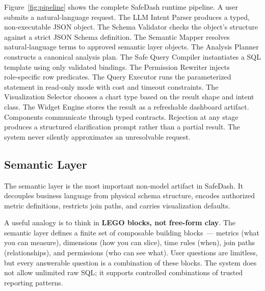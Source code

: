 \documentclass[11pt]{article}
\begin{document}
Figure~\ref{fig:pipeline} shows the complete SafeDash runtime pipeline. A user submits a natural‑language request. The LLM Intent Parser produces a typed, non‑executable JSON object. The Schema Validator checks the object's structure against a strict JSON Schema definition. The Semantic Mapper resolves natural‑language terms to approved semantic layer objects. The Analysis Planner constructs a canonical analysis plan. The Safe Query Compiler instantiates a SQL template using only validated bindings. The Permission Rewriter injects role‑specific row predicates. The Query Executor runs the parameterized statement in read‑only mode with cost and timeout constraints. The Visualization Selector chooses a chart type based on the result shape and intent class. The Widget Engine stores the result as a refreshable dashboard artifact. Components communicate through typed contracts. Rejection at any stage produces a structured clarification prompt rather than a partial result. The system never silently approximates an unresolvable request.

\subsection{Semantic Layer}
The semantic layer is the most important non‑model artifact in SafeDash. It decouples business language from physical schema structure, encodes authorized metric definitions, restricts join paths, and carries visualization defaults.

A useful analogy is to think in \textbf{LEGO blocks, not free-form clay}. The semantic layer defines a finite set of composable building blocks~--- metrics (what you can measure), dimensions (how you can slice), time rules (when), join paths (relationships), and permissions (who can see what). User questions are limitless, but every answerable question is a combination of these blocks. The system does not allow unlimited raw SQL; it supports controlled combinations of trusted reporting patterns.
\end{document}
